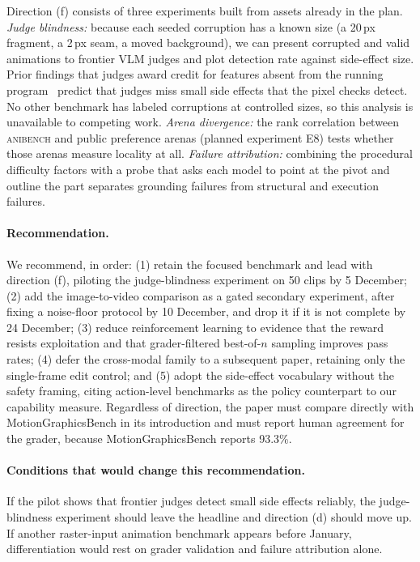 \documentclass[11pt]{article}
\newcommand{\anibench}{\textsc{anibench}}
\begin{document}
Direction (f) consists of three experiments built from assets already in the plan. \emph{Judge blindness:} because each seeded corruption has a known size (a 20\,px fragment, a 2\,px seam, a moved background), we can present corrupted and valid animations to frontier VLM judges and plot detection rate against side-effect size. Prior findings that judges award credit for features absent from the running program~\citep{bakshi2026worldbench} predict that judges miss small side effects that the pixel checks detect. No other benchmark has labeled corruptions at controlled sizes, so this analysis is unavailable to competing work. \emph{Arena divergence:} the rank correlation between \anibench{} and public preference arenas (planned experiment E8) tests whether those arenas measure locality at all. \emph{Failure attribution:} combining the procedural difficulty factors with a probe that asks each model to point at the pivot and outline the part separates grounding failures from structural and execution failures.

\paragraph{Recommendation.} We recommend, in order: (1) retain the focused benchmark and lead with direction (f), piloting the judge-blindness experiment on 50 clips by 5 December; (2) add the image-to-video comparison as a gated secondary experiment, after fixing a noise-floor protocol by 10 December, and drop it if it is not complete by 24 December; (3) reduce reinforcement learning to evidence that the reward resists exploitation and that grader-filtered best-of-$n$ sampling improves pass rates; (4) defer the cross-modal family to a subsequent paper, retaining only the single-frame edit control; and (5) adopt the side-effect vocabulary without the safety framing, citing action-level benchmarks as the policy counterpart to our capability measure. Regardless of direction, the paper must compare directly with MotionGraphicsBench in its introduction and must report human agreement for the grader, because MotionGraphicsBench reports 93.3\%.

\paragraph{Conditions that would change this recommendation.} If the pilot shows that frontier judges detect small side effects reliably, the judge-blindness experiment should leave the headline and direction (d) should move up. If another raster-input animation benchmark appears before January, differentiation would rest on grader validation and failure attribution alone.
\end{document}
